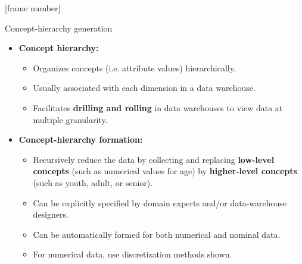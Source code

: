 \documentclass[aspectratio=169,t]{beamer}
\begin{document}
  {
    [frame number]
    \begin{frame}{Concept-hierarchy generation}
        \begin{itemize}
            \item \textbf{Concept hierarchy:}
            \begin{itemize}
              \item Organizes concepts (i.e. attribute values) hierarchically.
              \item Usually associated with each dimension in a data warehouse.
              \item Facilitates \textbf{drilling and rolling} in data warehouses to view data at multiple granularity.
            \end{itemize}
            \item \textbf{Concept-hierarchy formation:}
            \begin{itemize}
              \item Recursively reduce the data by collecting and replacing \textbf{low-level concepts} (such as numerical values for age) by \textbf{higher-level concepts} (such as youth, adult, or senior).
              \item Can be explicitly specified by domain experts and/or data-warehouse designers.
              \item Can be automatically formed for both numerical and nominal data.
              \item For numerical data, use discretization methods shown.
            \end{itemize}
        \end{itemize}
    \end{frame}
  }
\end{document}
